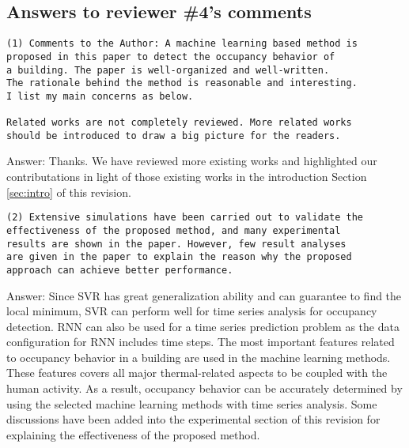 

\subsection{Answers to reviewer \#4's comments}
\begin{verbatim}
(1) Comments to the Author: A machine learning based method is
proposed in this paper to detect the occupancy behavior of
a building. The paper is well-organized and well-written.
The rationale behind the method is reasonable and interesting.
I list my main concerns as below.

Related works are not completely reviewed. More related works
should be introduced to draw a big picture for the readers.
\end{verbatim}

Answer: Thanks. We have reviewed more existing works and highlighted
our contributations in light of those existing works in the introduction
Section \ref{sec:intro} of this revision.



\begin{verbatim}
(2) Extensive simulations have been carried out to validate the
effectiveness of the proposed method, and many experimental
results are shown in the paper. However, few result analyses
are given in the paper to explain the reason why the proposed
approach can achieve better performance.
\end{verbatim}

Answer: Since SVR has great generalization ability and can guarantee
to find the local minimum, SVR can perform well for time series
analysis for occupancy detection. RNN can
also be used for a time series prediction problem as the data
configuration for RNN includes time steps. The most important features
related to occupancy behavior in a building are used in the machine
learning methods. These features covers all major thermal-related
aspects to be coupled with the human activity. As a result, occupancy
behavior can be accurately determined by using the selected machine
learning methods with time series analysis. Some
discussions have been added into the experimental section of this revision
for explaining the effectiveness of the proposed method. 

